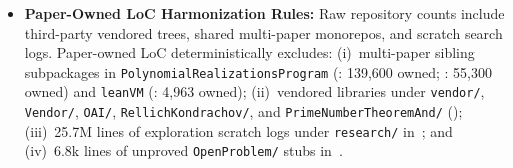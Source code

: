\documentclass[11pt,letterpaper]{article}
\begin{document}
\begin{itemize}
  \item \textbf{Paper-Owned LoC Harmonization Rules:} Raw repository counts include third-party vendored trees, shared multi-paper monorepos, and scratch search logs. Paper-owned LoC deterministically excludes: (i)~multi-paper sibling subpackages in \texttt{PolynomialRealizationsProgram} (\cite{arxiv2611_09050}: 139,600 owned; \cite{arxiv2611_13584}: 55,300 owned) and \texttt{leanVM} (\cite{arxiv2611_15128}: 4,963 owned); (ii)~vendored libraries under \texttt{vendor/}, \texttt{Vendor/}, \texttt{OAI/}, \texttt{RellichKondrachov/}, and \texttt{PrimeNumberTheoremAnd/} (\cite{arxiv2611_02465,arxiv2611_09066,arxiv2611_11805,arxiv2611_19243,arxiv2611_20890}); (iii)~25.7M lines of exploration scratch logs under \texttt{research/} in~\cite{arxiv2611_06896}; and (iv)~6.8k lines of unproved \texttt{OpenProblem/} stubs in~\cite{arxiv2511_13056}.
\end{itemize}



\end{document}
